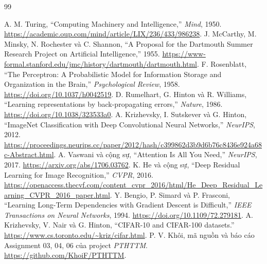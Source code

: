 \documentclass[12pt,a4paper]{report}
\begin{document}
\clearpage
\begin{thebibliography}{99}
 A. M. Turing, ``Computing Machinery and Intelligence,'' \textit{Mind}, 1950. \url{https://academic.oup.com/mind/article/LIX/236/433/986238}.
 J. McCarthy, M. Minsky, N. Rochester và C. Shannon, ``A Proposal for the Dartmouth Summer Research Project on Artificial Intelligence,'' 1955. \url{https://www-formal.stanford.edu/jmc/history/dartmouth/dartmouth.html}.
 F. Rosenblatt, ``The Perceptron: A Probabilistic Model for Information Storage and Organization in the Brain,'' \textit{Psychological Review}, 1958. \url{https://doi.org/10.1037/h0042519}.
 D. Rumelhart, G. Hinton và R. Williams, ``Learning representations by back-propagating errors,'' \textit{Nature}, 1986. \url{https://doi.org/10.1038/323533a0}.
 A. Krizhevsky, I. Sutskever và G. Hinton, ``ImageNet Classification with Deep Convolutional Neural Networks,'' \textit{NeurIPS}, 2012. \url{https://proceedings.neurips.cc/paper/2012/hash/c399862d3b9d6b76c8436e924a68c-Abstract.html}.
 A. Vaswani và cộng sự, ``Attention Is All You Need,'' \textit{NeurIPS}, 2017. \url{https://arxiv.org/abs/1706.03762}.
 K. He và cộng sự, ``Deep Residual Learning for Image Recognition,'' \textit{CVPR}, 2016. \url{https://openaccess.thecvf.com/content_cvpr_2016/html/He_Deep_Residual_Learning_CVPR_2016_paper.html}.
 Y. Bengio, P. Simard và P. Frasconi, ``Learning Long-Term Dependencies with Gradient Descent is Difficult,'' \textit{IEEE Transactions on Neural Networks}, 1994. \url{https://doi.org/10.1109/72.279181}.
 A. Krizhevsky, V. Nair và G. Hinton, ``CIFAR-10 and CIFAR-100 datasets.'' \url{https://www.cs.toronto.edu/~kriz/cifar.html}.
 P. V. Khôi, mã nguồn và báo cáo Assignment 03, 04, 06 của project \textit{PTHTTM}. \url{https://github.com/KhoiF/PTHTTM}.
\end{thebibliography}
\end{document}
